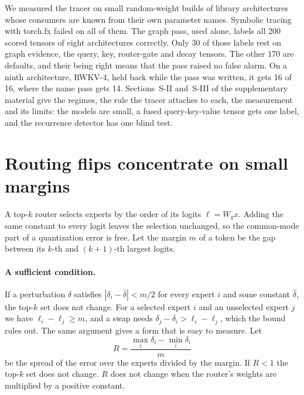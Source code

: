 \documentclass[journal]{IEEEtran}
\begin{document}
We measured the tracer on small random-weight builds of library architectures whose consumers are
known from their own parameter names. Symbolic tracing with torch.fx \citep{reed2022torchfx}
failed on all of them. The graph pass, used alone, labels all 200 scored tensors of eight
architectures correctly. Only 30 of those labels rest on graph evidence, the query, key,
router-gate and decay tensors. The other 170 are defaults, and their being right means that the
pass raised no false alarm. On a ninth architecture, RWKV-4, held back while the pass was
written, it gets 16 of 16, where the name pass gets 14. Sections~S-II and~S-III of the
supplementary material give the regimes, the rule the tracer attaches to each, the measurement
and its limits: the models are small, a fused query-key-value tensor gets one label, and the
recurrence detector has one blind test.

\section{Routing flips concentrate on small margins}\label{sec:route}

A top-$k$ router selects experts by the order of its logits $\ell = W_g x$. Adding the same
constant to every logit leaves the selection unchanged, so the common-mode part of a
quantization error is free. Let the margin $m$ of a token be the gap between its $k$-th and
$(k{+}1)$-th largest logits.

\paragraph{A sufficient condition.} If a perturbation $\delta$ satisfies
$|\delta_i - \bar\delta| < m/2$ for every expert $i$ and some constant $\bar\delta$, the top-$k$
set does not change. For a selected expert $i$ and an unselected expert $j$ we have
$\ell_i - \ell_j \geq m$, and a swap needs $\delta_j - \delta_i > \ell_i - \ell_j$, which the
bound rules out. The same argument gives a form that is easy to measure. Let
\begin{equation}
R = \frac{\max_i \delta_i - \min_i \delta_i}{m}
\end{equation}
be the spread of the error over the experts divided by the margin. If $R < 1$ the top-$k$ set
does not change. $R$ does not change when the router's weights are multiplied by a positive
constant.
\end{document}
